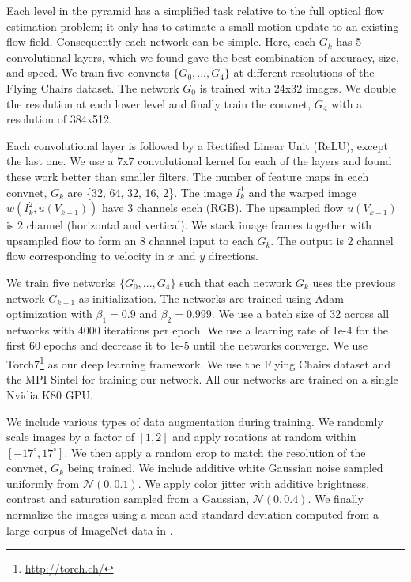 \documentclass[10pt,twocolumn,letterpaper]{article}
\begin{document}
Each level in the pyramid has a simplified task relative to the full optical flow estimation problem; it only has to estimate a small-motion update to an existing flow field.
Consequently each network can be simple.
Here, each $G_k$ has 5 convolutional layers, which we found gave the best combination of accuracy, size, and speed.
We train five convnets $\{G_0, ..., G_4 \}$ at different resolutions of the Flying Chairs dataset. The network $G_0$ is trained with 24x32 images. We double the resolution at each lower level and finally train the convnet, $G_4$ with a resolution of 384x512.

Each convolutional layer is followed by a Rectified Linear Unit (ReLU), except the last one. 
We use a 7x7 convolutional kernel for each of the layers and found these work better than smaller filters.
The number of feature maps in each convnet, $G_k$ are \{32, 64, 32, 16, 2\}. The image $I^1_k$ and the warped image $w(I^2_k, u(V_{k-1}))$ have 3 channels each (RGB). The upsampled flow $u(V_{k-1})$ is 2 channel (horizontal and vertical).  
We stack image frames together with upsampled flow to form an 8 channel input to each $G_k$. The output is 2 channel flow corresponding to velocity in $x$ and $y$ directions. 


We train five networks $\{G_0, ..., G_4 \}$ such that each network $G_k$ uses the previous network $G_{k-1}$ as initialization. The networks are trained using Adam \cite{kingma2014adam} optimization with $\beta_1 = 0.9$ and $\beta_2 = 0.999$. We use a batch size of 32 across all networks with 4000 iterations per epoch. We use a learning rate of 1e-4 for the first 60 epochs and decrease it to 1e-5 until the networks converge. We use Torch7\footnote{\url{http://torch.ch/}} as our deep learning framework. We use the Flying Chairs \cite{dosovitskiy2015flownet} dataset and the MPI Sintel \cite{Butler:ECCV:2012} for training our network. 
All our networks are trained on a single Nvidia K80 GPU.

We include various types of data augmentation during training. We randomly scale images by a factor of $[1, 2]$ and apply rotations at random within $[-17^{\circ}, 17^{\circ}]$. We then apply a random crop to match the resolution of the convnet, $G_k$ being trained. We include additive white Gaussian noise sampled uniformly from $\mathcal{N}(0, 0.1)$. We apply color jitter with additive brightness, contrast and saturation sampled from a Gaussian, $\mathcal{N}(0, 0.4)$. We finally normalize the images using a mean and standard deviation computed from a large corpus of ImageNet \cite{ILSVRC15} data in \cite{he2015deep}.
\end{document}
